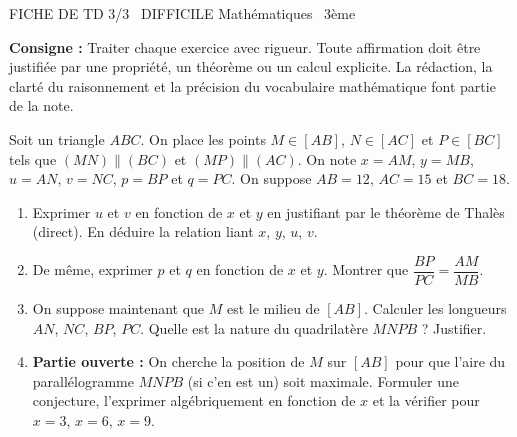 \documentclass[11pt]{article}
\begin{document}
\begin{tcolorbox}[enhanced,colback=popink,colframe=popink,arc=10pt,boxrule=0pt,left=12pt,right=12pt,top=9pt,bottom=9pt]
{\color{white}\popxbold\small FICHE DE TD 3/3 \textbullet\ DIFFICILE \hfill Mathématiques \textbullet\ 3ème\par}
\end{tcolorbox}
\vspace{4pt}
\noindent \textbf{Consigne :} Traiter chaque exercice avec rigueur. Toute affirmation doit être justifiée par une propriété, un théorème ou un calcul explicite. La rédaction, la clarté du raisonnement et la précision du vocabulaire mathématique font partie de la note.

\begin{exercice}
Soit un triangle $ABC$. On place les points $M \in [AB]$, $N \in [AC]$ et $P \in [BC]$ tels que $(MN) \parallel (BC)$ et $(MP) \parallel (AC)$.
On note $x = AM$, $y = MB$, $u = AN$, $v = NC$, $p = BP$ et $q = PC$. On suppose $AB = 12$, $AC = 15$ et $BC = 18$.
\begin{enumerate}
    \item Exprimer $u$ et $v$ en fonction de $x$ et $y$ en justifiant par le théorème de Thalès (direct). En déduire la relation liant $x$, $y$, $u$, $v$.
    \item De même, exprimer $p$ et $q$ en fonction de $x$ et $y$. Montrer que $\dfrac{BP}{PC} = \dfrac{AM}{MB}$.
    \item On suppose maintenant que $M$ est le milieu de $[AB]$. Calculer les longueurs $AN$, $NC$, $BP$, $PC$. Quelle est la nature du quadrilatère $MNPB$ ? Justifier.
    \item \textbf{Partie ouverte :} On cherche la position de $M$ sur $[AB]$ pour que l'aire du parallélogramme $MNPB$ (si c'en est un) soit maximale. Formuler une conjecture, l'exprimer algébriquement en fonction de $x$ et la vérifier pour $x=3$, $x=6$, $x=9$.
\end{enumerate}
\end{exercice}
\end{document}
